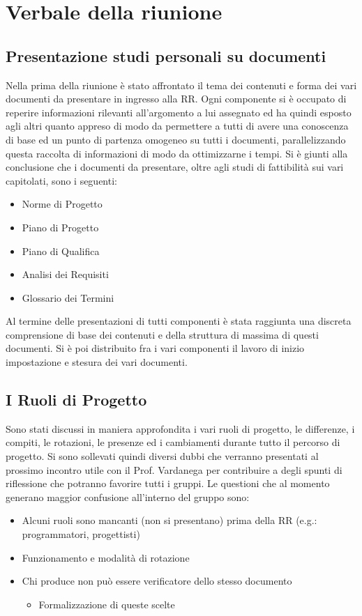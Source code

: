 \section{Verbale della riunione}
\subsection{Presentazione studi personali su documenti}
Nella prima della riunione è stato affrontato il tema dei contenuti e forma dei vari documenti da presentare in ingresso alla RR. Ogni componente si è occupato di reperire informazioni rilevanti all'argomento a lui assegnato ed ha quindi esposto agli altri quanto appreso di modo da permettere a tutti di avere una conoscenza di base ed un punto di partenza omogeneo su tutti i documenti, parallelizzando questa raccolta di informazioni di modo da ottimizzarne i tempi.
Si è giunti alla conclusione che i documenti da presentare, oltre agli studi di fattibilità sui vari capitolati, sono i seguenti:
\begin{itemize}
    \item Norme di Progetto
    \item Piano di Progetto
    \item Piano di Qualifica
    \item Analisi dei Requisiti
    \item Glossario dei Termini
\end{itemize}
Al termine delle presentazioni di tutti componenti è stata raggiunta una discreta comprensione di base dei contenuti e della struttura di massima di questi documenti.
Si è poi distribuito fra i vari componenti il lavoro di inizio impostazione e stesura dei vari documenti.

\subsection{I Ruoli di Progetto}
Sono stati discussi in maniera approfondita i vari ruoli di progetto, le differenze, i compiti, le rotazioni, le presenze ed i cambiamenti durante tutto il percorso di progetto. Si sono sollevati quindi diversi dubbi che verranno presentati al prossimo incontro utile con il Prof. Vardanega per contribuire a degli spunti di riflessione che potranno favorire tutti i gruppi. Le questioni che al momento generano maggior confusione all'interno del gruppo sono:
\begin{itemize}
    \item Alcuni ruoli sono mancanti (non si presentano) prima della RR (e.g.: programmatori, progettisti)
    \item Funzionamento e modalità di rotazione
    \item Chi produce non può essere verificatore dello stesso documento
    \begin{itemize}
        \item Formalizzazione di queste scelte
    \end{itemize}
\end{itemize}

